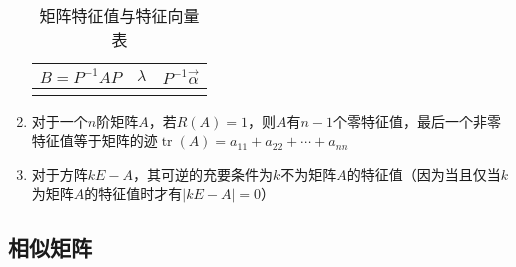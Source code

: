 \documentclass[12pt,a4paper,UTF8]{book}
\begin{document}
\begin{enumerate}
\begin{normalsize}
\begin{center}
\begin{longtable}{|c|c|c|}
\hline
$B=P^{-1}AP$&$\lambda$&$P^{-1}\vec{\alpha}$\\
\hline
\caption{矩阵特征值与特征向量表}
\label{tab:Margin_settings}
\end{longtable}
\end{center}
\end{normalsize}
\item 对于一个$n$阶矩阵$A$，若$R\left(A\right)=1$，则$A$有$n-1$个零特征值，最后一个非零特征值等于矩阵的迹$\operatorname{tr}\left(A\right)=a_{11}+a_{22}+\cdots+a_{nn}$
\item 对于方阵$kE-A$，其可逆的充要条件为$k$不为矩阵$A$的特征值（因为当且仅当$k$为矩阵$A$的特征值时才有$\left|kE-A\right|=0$）
\end{enumerate}

\subsection{相似矩阵}
\end{document}
